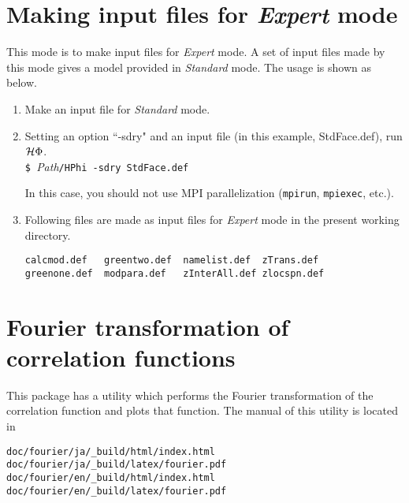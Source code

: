 \section{Making input files for {\it Expert} mode}
This mode is to make input files for {\it Expert} mode. A set of input files made by this mode gives a model provided in {\it Standard} mode.
The usage is shown as below.
\begin{enumerate}
\item{Make an input file for {\it Standard} mode.}
\item{Setting an option ``-sdry" and an input file (in this example, StdFace.def), run $\mathcal{H} \Phi$.}\\
\verb|$ |\textit{Path}\verb|/HPhi -sdry StdFace.def|

In this case, you should not use MPI parallelization (\verb|mpirun|, \verb|mpiexec|, etc.).
\item{Following files are made as input files for {\it Expert} mode in the present working directory.}\\
\begin{minipage}{12cm}
\begin{screen}
\begin{verbatim}
calcmod.def   greentwo.def  namelist.def  zTrans.def
greenone.def  modpara.def   zInterAll.def zlocspn.def
\end{verbatim}
\end{screen}
\end{minipage}
\end{enumerate}

\section{Fourier transformation of correlation functions}

This package has a utility which performs the Fourier transformation of the correlation function and plots that function.
The manual of this utility is located in
\begin{verbatim}
doc/fourier/ja/_build/html/index.html
doc/fourier/ja/_build/latex/fourier.pdf
doc/fourier/en/_build/html/index.html
doc/fourier/en/_build/latex/fourier.pdf
\end{verbatim}
